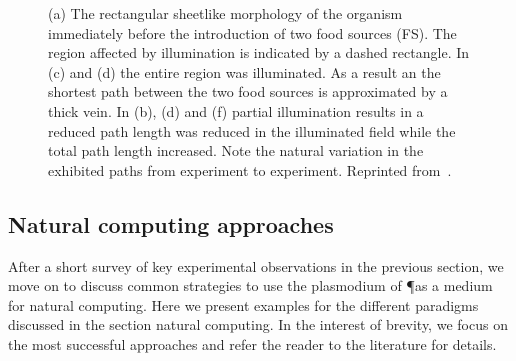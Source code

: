 			\begin{figure}[htop]
				\centering
				\newline
				\newline

				\caption[Classic maze experiment with \P]{(a)  The  rectangular  sheetlike  morphology  of  the organism  immediately  before  the  introduction  of  two  food sources (FS). The region affected by illumination is indicated by a dashed rectangle. In (c) and (d) the entire region was illuminated. As a result an the shortest path between the two food sources is approximated by a thick vein. In (b), (d) and (f) partial illumination results in a reduced path length was reduced in the illuminated field while the total path length increased. Note the natural variation in the exhibited paths from experiment to experiment.  Reprinted from~\cite{PhysRevLett.99.068104}.}
				\label{fig:snell}
			\end{figure}

			\FloatBarrier

	\subsection{Natural computing approaches}

		After a short survey of key experimental observations in the previous section, we move on to discuss common strategies to use the plasmodium of \P as a medium for natural computing. Here we present examples for the different paradigms discussed in the section natural computing. In the interest of brevity, we focus on the most successful approaches and refer the reader to the literature for details.

